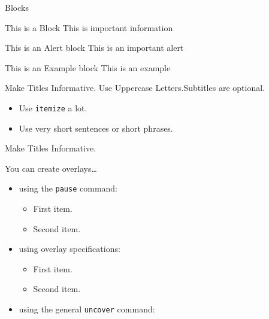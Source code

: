 \documentclass{beamer}
\begin{document}
\begin{frame}{Blocks}
 
   \begin{block}{This is a Block}
      This is important information
   \end{block}
 
   \begin{alertblock}{This is an Alert block}
   This is an important alert
   \end{alertblock}
 
   \begin{exampleblock}{This is an Example block}
   This is an example 
   \end{exampleblock}
 
\end{frame}





\begin{frame}{Make Titles Informative. Use Uppercase Letters.}{Subtitles are optional.}

  \begin{itemize}
  \item
    Use \texttt{itemize} a lot.
  \item
    Use very short sentences or short phrases.
  \end{itemize}
\end{frame}

\begin{frame}{Make Titles Informative.}

  You can create overlays\dots
  \begin{itemize}
  \item using the \texttt{pause} command:
    \begin{itemize}
    \item
      First item.
      \pause
    \item    
      Second item.
    \end{itemize}
  \item
    using overlay specifications:
    \begin{itemize}
    \item<3->
      First item.
    \item<4->
      Second item.
    \end{itemize}
  \item
    using the general \texttt{uncover} command:
    \begin{itemize}
    \end{itemize}
  \end{itemize}
\end{frame}
\end{document}
